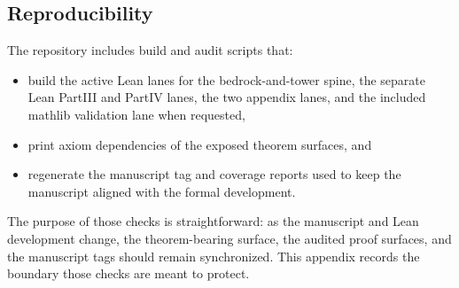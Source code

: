 \subsection{Reproducibility}
\label{subsec:formal-reproducibility}

The repository includes build and audit scripts that:
\begin{itemize}[itemsep=0.2em]
\item build the active Lean lanes for the bedrock-and-tower spine, the separate Lean PartIII and PartIV lanes, the two appendix lanes, and the included mathlib validation lane when requested,
\item print axiom dependencies of the exposed theorem surfaces, and
\item regenerate the manuscript tag and coverage reports used to keep the
      manuscript aligned with the formal development.
\end{itemize}

The purpose of those checks is straightforward: as the manuscript and Lean
development change, the theorem-bearing surface, the audited proof surfaces,
and the manuscript tags should remain synchronized. This appendix records the
boundary those checks are meant to protect.

